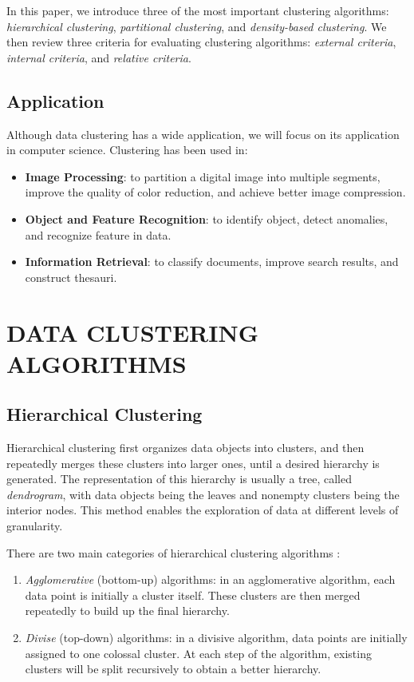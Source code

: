 \documentclass[conference]{IEEEtran}
\begin{document}
In this paper, we introduce three of the most important clustering algorithms: \textit{hierarchical clustering}, \textit{partitional clustering}, and \textit{density-based clustering}. We then review three criteria for evaluating clustering algorithms: \textit{external criteria}, \textit{internal criteria}, and \textit{relative criteria}.

\subsection{Application}
Although data clustering has a wide application, we will focus on its application in computer science. Clustering has been used in:
\begin{itemize}
\item \textbf{Image Processing}: to partition a digital image into multiple segments, improve the quality of color reduction, and achieve better image compression.
\item \textbf{Object and Feature Recognition}: to identify object, detect anomalies, and recognize feature in data.
\item \textbf{Information Retrieval}: to classify documents, improve search results, and construct thesauri.
\end{itemize}

\section{DATA CLUSTERING ALGORITHMS}
\subsection{Hierarchical Clustering}

Hierarchical clustering first organizes data objects into clusters, and then repeatedly merges these clusters into larger ones, until a desired hierarchy is generated. The representation of this hierarchy is usually a tree, called \textit{dendrogram}, with data objects being the leaves and nonempty clusters being the interior nodes. This method enables the exploration of data at different levels of granularity.

There are two main categories of hierarchical clustering algorithms \cite{steinbach2000comparison}:

\begin{enumerate}
\item \textit{Agglomerative} (bottom-up) algorithms: in an agglomerative algorithm, each data point is initially a cluster itself. These clusters are then merged repeatedly to build up the final hierarchy.
\item \textit{Divise} (top-down) algorithms: in a divisive algorithm, data points are initially assigned to one colossal cluster. At each step of the algorithm, existing clusters will be split recursively to obtain a better hierarchy.
\end{enumerate}
\end{document}
